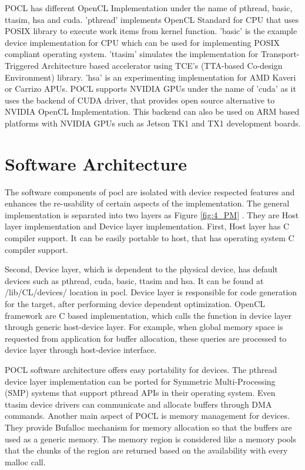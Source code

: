 POCL has different OpenCL Implementation under the name of pthread, basic, ttasim, hsa and cuda. 'pthread' implements OpenCL Standard for CPU that uses POSIX library to execute work items from kernel function. 'basic' is the example device implementation for CPU which can be used for implementing POSIX compliant operating system. 'ttasim' simulates the implementation for Transport-Triggered Architecture based accelerator using TCE’s (TTA-based Co-design Environment) library. 'hsa' is an experimenting implementation for AMD Kaveri or Carrizo APUs. POCL supports NVIDIA GPUs under the name of 'cuda' as it uses the backend of CUDA driver, that provides open source alternative to NVIDIA OpenCL Implementation. This backend can also be used on ARM based platforms with NVIDIA GPUs such as Jetson TK1 and TX1 development boards.
 
\section{Software Architecture}
The software components of pocl are isolated with device respected features and enhances the re-usability of certain aspects of the implementation. The general implementation is separated into two layers as Figure \ref{fig:4_PM} \cite{18}. They are Host layer implementation and Device layer implementation. First, Host layer has C compiler support. It can be easily portable to host, that has operating system C compiler support.


Second, Device layer, which is dependent to the physical device, has default devices such as pthread, cuda, basic, ttasim and hsa. It can be found at /lib/CL/devices/ location in pocl. Device layer is responsible for code generation for the target, after performing device dependent optimization. OpenCL framework are C based implementation, which calls the function in device layer through generic host-device layer. For example, when global memory space is requested from application for buffer allocation, these queries are processed to device layer through host-device interface.

POCL software architecture offers easy portability for devices. The pthread device layer implementation can be ported for Symmetric Multi-Processing (SMP) systems that support pthread APIs in their operating system. Even ttasim device drivers can communicate and allocate buffers through DMA commands. Another main aspect of POCL is memory management for devices. They provide Bufalloc mechanism for memory allocation so that the buffers are used as a generic memory. The memory region is considered like a memory pools that the chunks of the region are returned based on the availability with every malloc call. 

